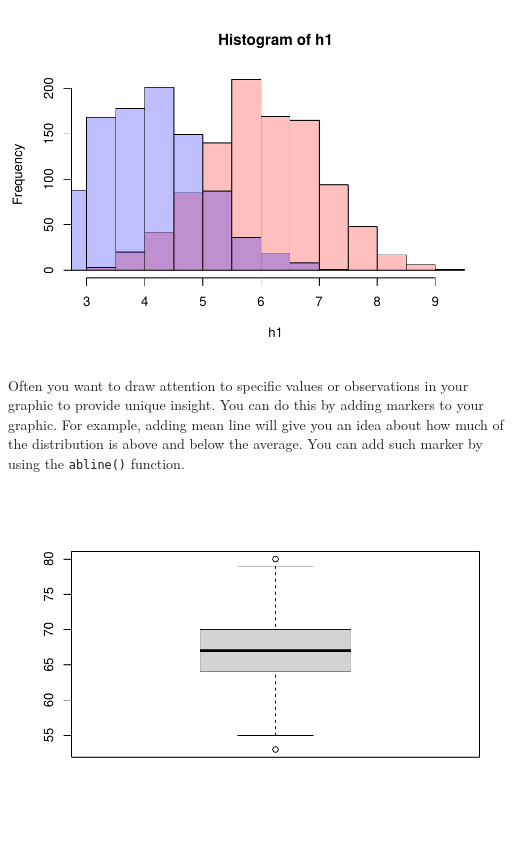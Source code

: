 \documentclass[
]{book}
\newenvironment{Shaded}{\begin{snugshade}}{\end{snugshade}}
\newcommand{\DataTypeTok}[1]{\textcolor[rgb]{0.13,0.29,0.53}{#1}}
\newcommand{\DecValTok}[1]{\textcolor[rgb]{0.00,0.00,0.81}{#1}}
\newcommand{\KeywordTok}[1]{\textcolor[rgb]{0.13,0.29,0.53}{\textbf{#1}}}
\newcommand{\NormalTok}[1]{#1}
\newcommand{\OperatorTok}[1]{\textcolor[rgb]{0.81,0.36,0.00}{\textbf{#1}}}
\newcommand{\StringTok}[1]{\textcolor[rgb]{0.31,0.60,0.02}{#1}}
\begin{document}
\includegraphics{_main_files/figure-latex/unnamed-chunk-132-1.pdf}

Often you want to draw attention to specific values or observations in your graphic to provide unique insight. You can do this by adding markers to your graphic. For example, adding mean line will give you an idea about how much of the distribution is above and below the average. You can add such marker by using the \texttt{abline()} function.

\begin{Shaded}
\end{Shaded}

\includegraphics{_main_files/figure-latex/unnamed-chunk-133-1.pdf}
\end{document}

